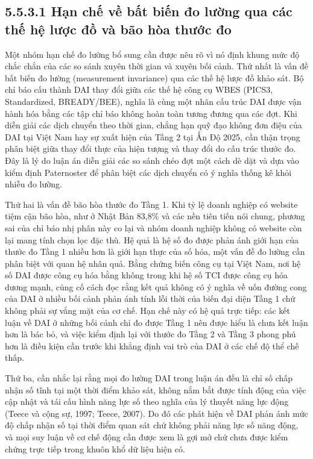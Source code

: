 \documentclass[
  a4paper,
  13pt]{extreport}
\begin{document}
\hypertarget{hux1ea1n-chux1ebf-vux1ec1-bux1ea5t-biux1ebfn-ux111o-lux1b0ux1eddng-qua-cuxe1c-thux1ebf-hux1ec7-lux1b0ux1ee3c-ux111ux1ed3-vuxe0-buxe3o-huxf2a-thux1b0ux1edbc-ux111o}{%
\subsection{5.5.3.1 Hạn chế về bất biến đo lường qua các thế hệ lược đồ
và bão hòa thước
đo}\label{hux1ea1n-chux1ebf-vux1ec1-bux1ea5t-biux1ebfn-ux111o-lux1b0ux1eddng-qua-cuxe1c-thux1ebf-hux1ec7-lux1b0ux1ee3c-ux111ux1ed3-vuxe0-buxe3o-huxf2a-thux1b0ux1edbc-ux111o}}

Một nhóm hạn chế đo lường bổ sung cần được nêu rõ vì nó định khung mức
độ chắc chắn của các so sánh xuyên thời gian và xuyên bối cảnh. Thứ nhất
là vấn đề bất biến đo lường (measurement invariance) qua các thế hệ lược
đồ khảo sát. Bộ chỉ báo cấu thành DAI thay đổi giữa các thế hệ công cụ
WBES (PICS3, Standardized, BREADY/BEE), nghĩa là cùng một nhãn cấu trúc
DAI được vận hành hóa bằng các tập chỉ báo không hoàn toàn tương đương
qua các đợt. Khi diễn giải các dịch chuyển theo thời gian, chẳng hạn quỹ
đạo không đơn điệu của DAI tại Việt Nam hay sự xuất hiện của Tầng 2 tại
Ấn Độ 2025, cần thận trọng phân biệt giữa thay đổi thực của hiện tượng
và thay đổi do cấu trúc thước đo. Đây là lý do luận án diễn giải các so
sánh chéo đợt một cách dè dặt và dựa vào kiểm định Paternoster để phân
biệt các dịch chuyển có ý nghĩa thống kê khỏi nhiễu đo lường.

Thứ hai là vấn đề bão hòa thước đo Tầng 1. Khi tỷ lệ doanh nghiệp có
website tiệm cận bão hòa, như ở Nhật Bản 83,8\% và các nền tiên tiến nói
chung, phương sai của chỉ báo nhị phân này co lại và nhóm doanh nghiệp
không có website còn lại mang tính chọn lọc đặc thù. Hệ quả là hệ số đo
được phản ánh giới hạn của thước đo Tầng 1 nhiều hơn là giới hạn thực
của số hóa, một vấn đề đo lường cần phân biệt với quan hệ nhân quả. Bằng
chứng biến công cụ tại Việt Nam, nơi hệ số DAI được công cụ hóa bằng
không trong khi hệ số TCI được công cụ hóa dương mạnh, củng cố cách đọc
rằng kết quả không có ý nghĩa về uốn đường cong của DAI ở nhiều bối cảnh
phản ánh tính lỗi thời của biến đại diện Tầng 1 chứ không phải sự vắng
mặt của cơ chế. Hạn chế này có hệ quả trực tiếp: các kết luận về DAI ở
những bối cảnh chỉ đo được Tầng 1 nên được hiểu là chưa kết luận hơn là
bác bỏ, và việc kiểm định lại với thước đo Tầng 2 và Tầng 3 phong phú
hơn là điều kiện cần trước khi khẳng định vai trò của DAI ở các chế độ
thể chế thấp.

Thứ ba, cần nhắc lại rằng mọi đo lường DAI trong luận án đều là chỉ số
chấp nhận số tĩnh tại một thời điểm khảo sát, không nắm bắt được tính
động của việc cập nhật và tái cấu hình năng lực số theo nghĩa của lý
thuyết năng lực động (Teece và cộng sự, 1997; Teece, 2007). Do đó các
phát hiện về DAI phản ánh mức độ chấp nhận số tại thời điểm quan sát chứ
không phải năng lực số năng động, và mọi suy luận về cơ chế động cần
được xem là gợi mở chứ chưa được kiểm chứng trực tiếp trong khuôn khổ dữ
liệu hiện có.
\end{document}
